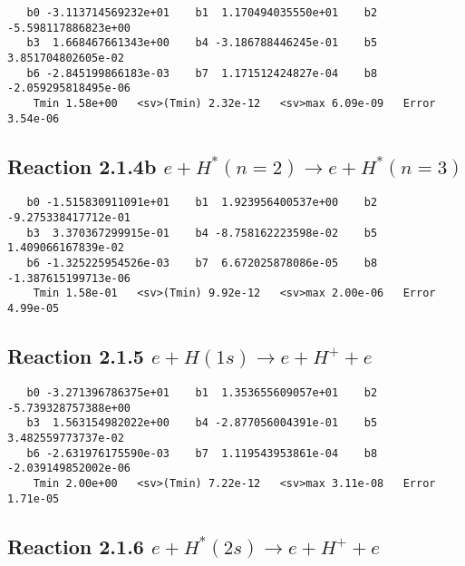 \documentclass[12pt]{article}
\begin{document}
\begin{small}\begin{verbatim}
   b0 -3.113714569232e+01    b1  1.170494035550e+01    b2 -5.598117886823e+00
   b3  1.668467661343e+00    b4 -3.186788446245e-01    b5  3.851704802605e-02
   b6 -2.845199866183e-03    b7  1.171512424827e-04    b8 -2.059295818495e-06
    Tmin 1.58e+00   <sv>(Tmin) 2.32e-12   <sv>max 6.09e-09   Error 3.54e-06
\end{verbatim}\end{small}

\newpage
\subsection{
Reaction 2.1.4b $   e + H^*(n=2) \rightarrow e + H^*(n=3)$}


\begin{small}\begin{verbatim}
   b0 -1.515830911091e+01    b1  1.923956400537e+00    b2 -9.275338417712e-01
   b3  3.370367299915e-01    b4 -8.758162223598e-02    b5  1.409066167839e-02
   b6 -1.325225954526e-03    b7  6.672025878086e-05    b8 -1.387615199713e-06
    Tmin 1.58e-01   <sv>(Tmin) 9.92e-12   <sv>max 2.00e-06   Error 4.99e-05
\end{verbatim}\end{small}

\newpage
\subsection{
Reaction 2.1.5 $   e + H(1s) \rightarrow e + H^+ + e$}


\begin{small}\begin{verbatim}
   b0 -3.271396786375e+01    b1  1.353655609057e+01    b2 -5.739328757388e+00
   b3  1.563154982022e+00    b4 -2.877056004391e-01    b5  3.482559773737e-02
   b6 -2.631976175590e-03    b7  1.119543953861e-04    b8 -2.039149852002e-06
    Tmin 2.00e+00   <sv>(Tmin) 7.22e-12   <sv>max 3.11e-08   Error 1.71e-05
\end{verbatim}\end{small}





\newpage
\subsection{
Reaction 2.1.6 $   e + H^*(2s) \rightarrow e + H^+ + e$}
\end{document}
